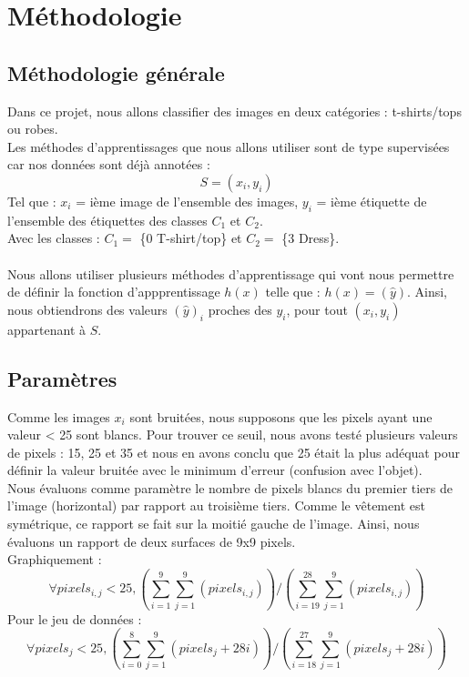\documentclass[a4paper,10pt]{article}
\begin{document}
\newpage
\section{Méthodologie}
	\subsection{Méthodologie générale}
		Dans ce projet, nous allons classifier des images en deux catégories : t-shirts/tops ou robes.\\
		Les méthodes d'apprentissages que nous allons utiliser sont de type supervisées car nos données sont déjà annotées :
		$$ S = {(x_i, y_i)} $$
		Tel que : $x_i$ = ième image de l'ensemble des images, $y_i$ = ième étiquette de l'ensemble des étiquettes des classes $C_1$ et $C_2$.\\
		Avec les classes : $C_1 =$ \{0 T-shirt/top\} et $C_2 =$ \{3 Dress\}.\\
		\\
		Nous allons utiliser plusieurs méthodes d’apprentissage qui vont nous permettre de définir la fonction d'appprentissage $h(x)$ telle que : $h(x) = (\hat y)$. Ainsi, nous obtiendrons des valeurs $(\hat y)_i$ proches des $y_i$, pour tout $(x_i, y_i)$ appartenant à $S$.\\

	\subsection{Paramètres}
		Comme les images $x_i$ sont bruitées, nous supposons que les pixels ayant une valeur < 25 sont blancs.
		Pour trouver ce seuil, nous avons testé plusieurs valeurs de pixels : 15, 25 et 35 et nous en avons conclu que 25 était la plus adéquat pour définir la valeur bruitée avec le minimum d'erreur (confusion avec l'objet).\\
		Nous évaluons comme paramètre le nombre de pixels blancs du premier tiers de l'image (horizontal) par rapport au troisième tiers. Comme le vêtement est symétrique, ce rapport se fait sur la moitié gauche de l'image. Ainsi, nous évaluons un rapport de deux surfaces de 9x9 pixels.	\\
		Graphiquement :
		$$ \forall pixels_{i,j} < 25,  (\sum_{i=1} ^9 \sum_{j=1} ^9  (pixels_{i,j})) / (\sum_{i=19} ^{28} \sum_{j=1}^9  (pixels_{i,j}) ) $$
		Pour le jeu de données :
		$$ \forall pixels_j < 25, (\sum_{i=0} ^8 \sum_{j=1} ^9  (pixels_j +28i) ) / (\sum_{i=18} ^{27} \sum_{j=1} ^9  (pixels_j+28i) ) $$
\end{document}
